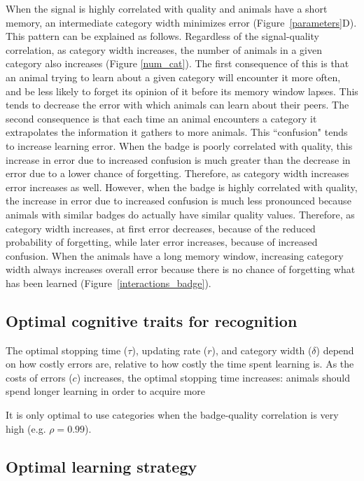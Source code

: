 When the signal is highly correlated with quality and animals have a short memory, an intermediate category width minimizes error (Figure~\ref{parameters}D). This pattern can be explained as follows. Regardless of the signal-quality correlation, as category width increases, the number of animals in a given category also increases (Figure \ref{num_cat}). The first consequence of this is that an animal trying to learn about a given category will encounter it more often, and be less likely to forget its opinion of it before its memory window lapses. This tends to decrease the error with which animals can learn about their peers. The second consequence is that each time an animal encounters a category it extrapolates the information it gathers to more animals. This ``confusion" tends to increase learning error. When the badge is poorly correlated with quality, this increase in error due to increased confusion is much greater than the decrease in error due to a lower chance of forgetting. Therefore, as category width increases error increases as well. However, when the badge is highly correlated with quality, the increase in error due to increased confusion is much less pronounced because animals with similar badges do actually have similar quality values. Therefore, as category width increases, at first error decreases, because of the reduced probability of forgetting, while later error increases, because of increased confusion. When the animals have a long memory window, increasing category width always increases overall error because there is no chance of forgetting what has been learned (Figure~\ref{interactions_badge}). 

\subsection*{Optimal cognitive traits for recognition}
The optimal stopping time ($\tau$), updating rate ($r$), and category width ($\delta$) depend on how costly errors are, relative to how costly the time spent learning is. As the costs of errors ($c$) increases, the optimal stopping time increases: animals should spend longer learning in order to acquire more 

It is only optimal to use categories when the badge-quality correlation is very high (e.g. $\rho=0.99$).

\subsection*{Optimal learning strategy}


